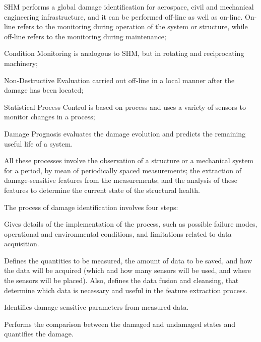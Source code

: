 \begin{description}[style=sameline]
\item[Structural Health Monitoring] SHM performs a global damage identification for aerospace, civil and mechanical engineering infrastructure, and it can be performed off-line as well as on-line.  On-line refers to the monitoring during operation of the system or structure, while off-line refers to the monitoring during maintenance;
\item[Condition Monitoring] Condition Monitoring is analogous to SHM, but in rotating and reciprocating machinery;
\item[Non-Destructive Evaluation] Non-Destructive Evaluation carried out off-line in a local manner after the damage has been located;
\item[Statistical Process Control] Statistical Process Control is based on process and uses a variety of sensors to monitor changes in a process;
\item[Damage Prognosis] Damage Prognosis evaluates the damage evolution and predicts the remaining useful life of a system.
\end{description}

All these processes involve the observation of a structure or a mechanical system for a period, by mean of periodically spaced measurements; the extraction of damage-sensitive features from the measurements; and the analysis of these features to determine the current state of the structural health.

The process of damage identification involves four steps:

\begin{description}[style=sameline]
\item[Operational Evaluation] Gives details of the implementation of the process, such as possible failure modes, operational and environmental conditions, and limitations related to data acquisition.
\item[Data Acquisition] Defines the quantities to be measured, the amount of data to be saved, and how the data will be acquired (which and how many sensors will be used, and where the sensors will be placed). Also, defines the data fusion and cleansing, that determine which data is necessary and useful in the feature extraction process.
\item[Feature Extraction] Identifies damage sensitive parameters from measured data.
\item[Classification] Performs the comparison between the damaged and undamaged states and quantifies the damage.
\end{description}


